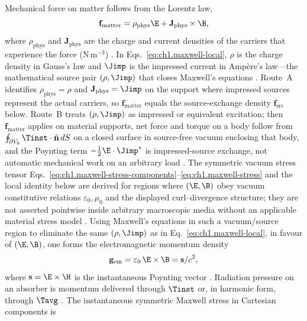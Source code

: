 Mechanical force on matter follows from the Lorentz law,
\begin{equation}
\label{eq:ch1.lorentz-force}
\mathbf{f}_{\mathrm{matter}}=\rho_{\mathrm{phys}}\E+\mathbf{J}_{\mathrm{phys}}\times\B,
\end{equation}
where $\rho_{\mathrm{phys}}$ and $\mathbf{J}_{\mathrm{phys}}$ are the charge and current densities of the carriers that experience the force (N\,m$^{-3}$) \cite{maxwell1873,stratton1941}.
In Eqs.~\eqref{eq:ch1.maxwell-local}, $\rho$ is the charge density in Gauss's law and $\Jimp$ is the impressed current in Amp\`ere's law---the mathematical source pair $(\rho,\Jimp)$ that closes Maxwell's equations \cite{maxwell1873,stratton1941}. Route~A identifies $\rho_{\mathrm{phys}}=\rho$ and $\mathbf{J}_{\mathrm{phys}}=\Jimp$ on the support where impressed sources represent the actual carriers, so $\mathbf{f}_{\mathrm{matter}}$ equals the source-exchange density $\mathbf{f}_{\mathrm{src}}$ below. Route~B treats $(\rho,\Jimp)$ as impressed or equivalent excitation; then $\mathbf{f}_{\mathrm{matter}}$ applies on material supports, net force and torque on a body follow from $\oint_{\partial V_b}\Tinst\cdot\hat{\mathbf{n}}\,dS$ on a closed surface in source-free vacuum enclosing that body, and the Poynting term $-\tfrac12\E\cdot\Jimp^*$ is impressed-source exchange, not automatic mechanical work on an arbitrary load \cite{poynting1884,stratton1941,harrington2001}.
The symmetric vacuum stress tensor Eqs.~\eqref{eq:ch1.maxwell-stress-components}--\eqref{eq:ch1.maxwell-stress} and the local identity below are derived for regions where $(\E,\B)$ obey vacuum constitutive relations $\varepsilon_0,\mu_0$ and the displayed curl--divergence structure; they are not asserted pointwise inside arbitrary macroscopic media without an applicable material stress model \cite{stratton1941}. Using Maxwell's equations in such a vacuum/source region to eliminate the same $(\rho,\Jimp)$ as in Eq.~\eqref{eq:ch1.maxwell-local}, in favour of $(\E,\B)$,
one forms the electromagnetic momentum density
\begin{equation}
\label{eq:ch1.momentum-density-instantaneous}
\mathbf{g}_{\mathrm{em}}=\varepsilon_0\,\E\times\B
=\mathbf{s}/c^2,
\end{equation}
where $\mathbf{s}=\E\times\H$ is the instantaneous Poynting vector \cite{maxwell1873,poynting1884}.
Radiation pressure on an absorber is momentum delivered through $\Tinst$ or, in harmonic form, through $\Tavg$ \cite{maxwell1873,stratton1941}. The instantaneous symmetric Maxwell stress in Cartesian components is
